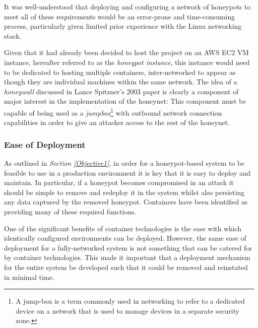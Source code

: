 It was well-understood that deploying and configuring a network of honeypots to meet all of these requirements would be an error-prone and time-consuming process, particularly given limited prior experience with the Linux networking stack. 

Given that it had already been decided to host the project on an AWS EC2 VM instance, hereafter referred to as the \textit{honeypot instance}, this instance would need to be dedicated to hosting multiple containers, inter-networked to appear as though they are individual machines within the same network. The idea of a \textit{honeywall} discussed in Lance Spitzner's 2003 paper \cite{Spitzner:2003:HCI:956415.956438} is clearly a component of major interest in the implementation of the honeynet: This component must be capable of being used as a \textit{jumpbox}\footnote{A jump-box is a term commonly used in networking to refer to a dedicated device on a network that is used to manage devices in a separate security zone.} with outbound network connection capabilities in order to give an attacker access to the rest of the honeynet.


      
 \subsubsection{Ease of Deployment} \label{EaseOfDeploymentDesignDecision}
		
		As outlined in \textit{Section \ref{Objective1}}, in order for a honeypot-based system to be feasible to use in a production environment it is key that it is easy to deploy and maintain. In particular, if a honeypot becomes compromised in an attack it should be simple to remove and redeploy it in the system whilst also persisting any data captured by the removed honeypot. Containers have been identified as providing many of these required functions.
        
        One of the significant benefits of container technologies is the ease with which identically configured environments can be deployed. However, the same ease of deployment for a fully-networked system is not something that can be catered for by container technologies. This made it important that a deployment mechanism for the entire system be developed such that it could be removed and reinstated in minimal time.
        

